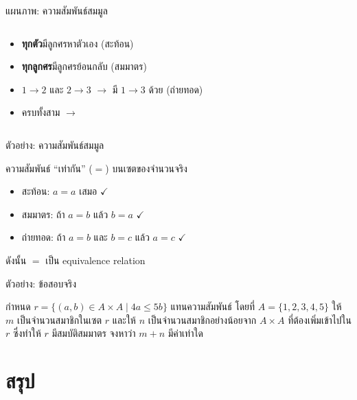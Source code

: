 \documentclass[11pt, aspectratio=169]{beamer}
\begin{document}
\begin{frame}{แผนภาพ: ความสัมพันธ์สมมูล}
\begin{columns}[T]
      \begin{intuition}[สังเกต]
        \begin{itemize}
          \item \textbf{ทุกตัว}มีลูกศรหาตัวเอง (สะท้อน)
          \item \textbf{ทุกลูกศร}มีลูกศรย้อนกลับ (สมมาตร)
          \item $1\!\to\!2$ และ $2\!\to\!3$ $\rightarrow$ มี $1\!\to\!3$ ด้วย (ถ่ายทอด)
          \item ครบทั้งสาม $\rightarrow$ 
        \end{itemize}
      \end{intuition}
  \end{columns}
\end{frame}\begin{frame}{ตัวอย่าง: ความสัมพันธ์สมมูล}

  \begin{exambox}[ตัวอย่าง]
    ความสัมพันธ์ ``เท่ากัน'' ($=$) บนเซตของจำนวนจริง
    \begin{itemize}
      \item สะท้อน: $a = a$ เสมอ $\checkmark$
      \item สมมาตร: ถ้า $a = b$ แล้ว $b = a$ $\checkmark$
      \item ถ่ายทอด: ถ้า $a = b$ และ $b = c$ แล้ว $a = c$ $\checkmark$
    \end{itemize}
    ดังนั้น $=$ เป็น equivalence relation
  \end{exambox}
\end{frame}\begin{frame}[t]{ตัวอย่าง: ข้อสอบจริง}
  \begin{exambox}[โจทย์ปี 68 ข้อ 9]
    กำหนด $r=\{(a,b) \in A \times  A \mid 4a \leq 5b\}$ แทนความสัมพันธ์ \newline
    โดยที่ $A=\{1,2,3,4,5\}$ ให้ $m$ เป็นจำนวนสมาชิกในเซต $r$ และให้ $n$ เป็นจำนวนสมาชิกอย่างน้อยจาก $A \times A$ ที่ต้องเพิ่มเข้าไปใน $r$ ซึ่งทำให้ $r$ มีสมบัติสมมาตร จงหาว่า $m+n$ มีค่าเท่าใด
  \end{exambox}

  \vspace{\fill}

\end{frame}

\section{สรุป}
\end{document}
